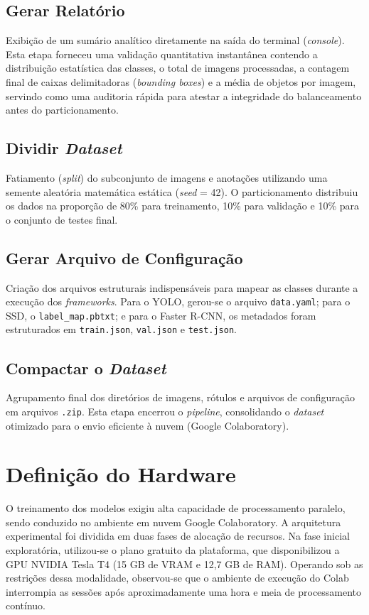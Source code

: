 \subsection{Gerar Relatório}
Exibição de um sumário analítico diretamente na saída do terminal (\textit{console}).
Esta etapa forneceu uma validação quantitativa instantânea contendo a distribuição
estatística das classes, o total de imagens processadas, a contagem final de caixas
delimitadoras (\textit{bounding boxes}) e a média de objetos por imagem, servindo como
uma auditoria rápida para atestar a integridade do balanceamento antes do
particionamento.

\subsection{Dividir \textit{Dataset}}
Fatiamento (\textit{split}) do subconjunto de imagens e anotações utilizando uma
semente aleatória matemática estática (\textit{seed} = 42).
O particionamento distribuiu os dados na proporção de 80\% para treinamento, 10\%
para validação e 10\% para o conjunto de testes final.

\subsection{Gerar Arquivo de Configuração}
Criação dos arquivos estruturais indispensáveis para mapear as classes durante a
execução dos \textit{frameworks}.
Para o YOLO, gerou-se o arquivo \texttt{data.yaml}; para o SSD, o
\texttt{label\_map.pbtxt}; e para o Faster R-CNN, os metadados foram estruturados em
\texttt{train.json}, \texttt{val.json} e \texttt{test.json}.

\subsection{Compactar o \textit{Dataset}}
Agrupamento final dos diretórios de imagens, rótulos e arquivos de configuração em
arquivos \texttt{.zip}.
Esta etapa encerrou o \textit{pipeline}, consolidando o \textit{dataset} otimizado
para o envio eficiente à nuvem (Google Colaboratory).

\section{Definição do Hardware}
O treinamento dos modelos exigiu alta capacidade de processamento paralelo, sendo conduzido no
ambiente em nuvem Google Colaboratory. A arquitetura experimental foi dividida em duas fases de
alocação de recursos. Na fase inicial exploratória, utilizou-se o plano gratuito da plataforma,
que disponibilizou a GPU NVIDIA Tesla T4 (15 GB de VRAM e 12,7 GB de RAM). Operando sob as
restrições dessa modalidade, observou-se que o ambiente de execução do Colab interrompia 
as sessões após aproximadamente uma hora e meia de processamento contínuo.

